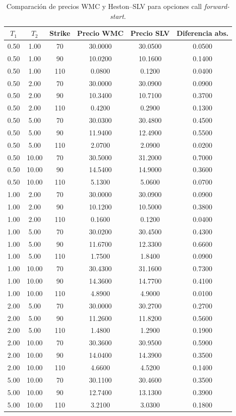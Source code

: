 \begin{table}[H]
\centering
\scriptsize
\begin{tabular}{|c|c|c|c|c|c|}
\hline
\(T_1\) & \(T_2\) & Strike & Precio WMC & Precio SLV & Diferencia abs. \\
\hline
0.50 & 1.00  & 70  & 30.0000 & 30.0500 & 0.0500 \\
0.50 & 1.00  & 90  & 10.0200 & 10.1600 & 0.1400 \\
0.50 & 1.00  & 110 & 0.0800  & 0.1200  & 0.0400 \\
\hline
0.50 & 2.00  & 70  & 30.0000 & 30.0900 & 0.0900 \\
0.50 & 2.00  & 90  & 10.3400 & 10.7100 & 0.3700 \\
0.50 & 2.00  & 110 & 0.4200  & 0.2900  & 0.1300 \\
\hline
0.50 & 5.00  & 70  & 30.0300 & 30.4800 & 0.4500 \\
0.50 & 5.00  & 90  & 11.9400 & 12.4900 & 0.5500 \\
0.50 & 5.00  & 110 & 2.0700  & 2.0900  & 0.0200 \\
\hline
0.50 & 10.00 & 70  & 30.5000 & 31.2000 & 0.7000 \\
0.50 & 10.00 & 90  & 14.5400 & 14.9000 & 0.3600 \\
0.50 & 10.00 & 110 & 5.1300  & 5.0600  & 0.0700 \\
\hline
1.00 & 2.00  & 70  & 30.0000 & 30.0900 & 0.0900 \\
1.00 & 2.00  & 90  & 10.1200 & 10.5000 & 0.3800 \\
1.00 & 2.00  & 110 & 0.1600  & 0.1200  & 0.0400 \\
\hline
1.00 & 5.00  & 70  & 30.0200 & 30.4500 & 0.4300 \\
1.00 & 5.00  & 90  & 11.6700 & 12.3300 & 0.6600 \\
1.00 & 5.00  & 110 & 1.7500  & 1.8400  & 0.0900 \\
\hline
1.00 & 10.00 & 70  & 30.4300 & 31.1600 & 0.7300 \\
1.00 & 10.00 & 90  & 14.3600 & 14.7700 & 0.4100 \\
1.00 & 10.00 & 110 & 4.8900  & 4.9000  & 0.0100 \\
\hline
2.00 & 5.00  & 70  & 30.0000 & 30.2700 & 0.2700 \\
2.00 & 5.00  & 90  & 11.2600 & 11.8200 & 0.5600 \\
2.00 & 5.00  & 110 & 1.4800  & 1.2900  & 0.1900 \\
\hline
2.00 & 10.00 & 70  & 30.3600 & 30.9500 & 0.5900 \\
2.00 & 10.00 & 90  & 14.0400 & 14.3900 & 0.3500 \\
2.00 & 10.00 & 110 & 4.6600  & 4.5200  & 0.1400 \\
\hline
5.00 & 10.00 & 70  & 30.1100 & 30.4600 & 0.3500 \\
5.00 & 10.00 & 90  & 12.7400 & 13.1300 & 0.3900 \\
5.00 & 10.00 & 110 & 3.2100  & 3.0300  & 0.1800 \\
\hline
\end{tabular}
\caption{Comparación de precios WMC y Heston--SLV para opciones call \textit{forward-start}.}
\label{tab:comparacion_forward_start_call_precios}
\end{table}


